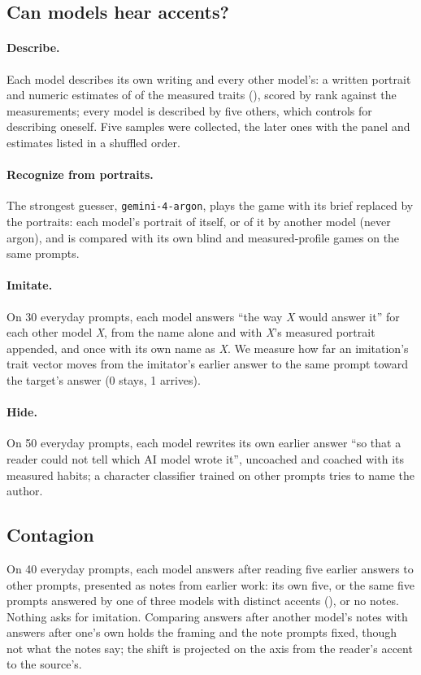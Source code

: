 \documentclass[11pt]{article}
\begin{document}
\subsection{Can models hear accents?}
\label{sec:hearing-method}
\paragraph{Describe.}
Each model describes its own writing and every other model's: a written portrait and numeric estimates of \nEstimates{} of the measured traits (\descEstimateList), scored by rank against the measurements; every model is described by five others, which controls for describing oneself.
Five samples were collected, the later ones with the panel and estimates listed in a shuffled order.
\paragraph{Recognize from portraits.}
The strongest guesser, \texttt{gemini-4-argon}, plays the game with its brief replaced by the portraits: each model's portrait of itself, or of it by another model (never argon), and is compared with its own blind and measured-profile games on the same prompts.
\paragraph{Imitate.}
On 30 everyday prompts, each model answers ``the way \emph{X} would answer it'' for each other model \emph{X}, from the name alone and with \emph{X}'s measured portrait appended, and once with its own name as \emph{X}.
We measure how far an imitation's trait vector moves from the imitator's earlier answer to the same prompt toward the target's answer (0 stays, 1 arrives).
\paragraph{Hide.}
On 50 everyday prompts, each model rewrites its own earlier answer ``so that a reader could not tell which AI model wrote it'', uncoached and coached with its measured habits; a character classifier trained on other prompts tries to name the author.

\subsection{Contagion}
\label{sec:contagion-method}
On 40 everyday prompts, each model answers after reading five earlier answers to other prompts, presented as notes from earlier work: its own five, or the same five prompts answered by one of three models with distinct accents (\conSources), or no notes.
Nothing asks for imitation.
Comparing answers after another model's notes with answers after one's own holds the framing and the note prompts fixed, though not what the notes say; the shift is projected on the axis from the reader's accent to the source's.
\end{document}

